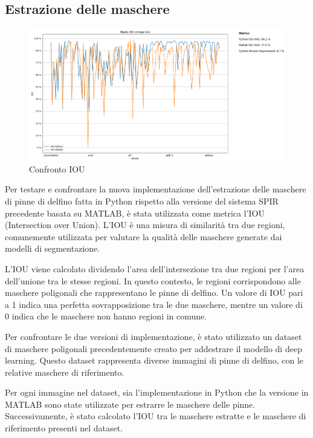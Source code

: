 \documentclass[a4paper,12pt]{report}
\begin{document}
    \subsection{Estrazione delle maschere}
    \begin{figure}[H]
      \centering
      \includegraphics[width=\textwidth]{assets/images/results/result_masks_iou.png}   
      \caption{Confronto IOU}
    \end{figure}
    Per testare e confrontare la nuova implementazione dell'estrazione delle maschere di pinne di delfino fatta in Python rispetto alla versione del sistema SPIR precedente basata su MATLAB, è stata utilizzata come metrica l'IOU (Intersection over Union). L'IOU è una misura di similarità tra due regioni, comunemente utilizzata per valutare la qualità delle maschere generate dai modelli di segmentazione.

    L'IOU viene calcolato dividendo l'area dell'intersezione tra due regioni per l'area dell'unione tra le stesse regioni. In questo contesto, le regioni corrispondono alle maschere poligonali che rappresentano le pinne di delfino. Un valore di IOU pari a 1 indica una perfetta sovrapposizione tra le due maschere, mentre un valore di 0 indica che le maschere non hanno regioni in comune.

    Per confrontare le due versioni di implementazione, è stato utilizzato un dataset di maschere poligonali precedentemente creato per addestrare il modello di deep learning. Questo dataset rappresenta diverse immagini di pinne di delfino, con le relative maschere di riferimento.

    Per ogni immagine nel dataset, sia l'implementazione in Python che la versione in MATLAB sono state utilizzate per estrarre le maschere delle pinne. Successivamente, è stato calcolato l'IOU tra le maschere estratte e le maschere di riferimento presenti nel dataset.
\end{document}
